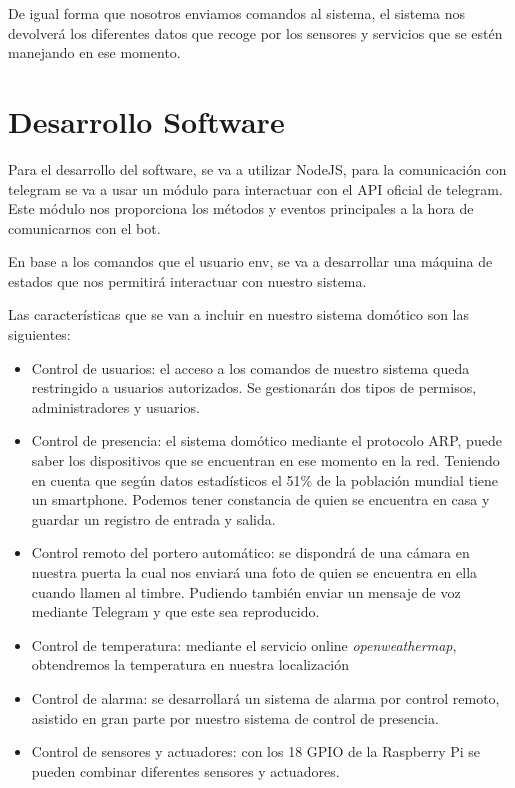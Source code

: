 \documentclass[10pt,journal,compsoc]{IEEEtran}
\begin{document}
De igual forma que nosotros enviamos comandos al sistema, el sistema nos devolverá los diferentes datos que recoge por los sensores y servicios que se estén manejando en ese momento.


\section{Desarrollo Software}
Para el desarrollo del software, se va a utilizar NodeJS, para la comunicación con telegram se va a usar un módulo para interactuar con el API oficial de telegram. Este módulo nos proporciona los métodos y eventos principales a la hora de comunicarnos con el bot.

En base a los comandos que el usuario env, se va a desarrollar una máquina de estados que nos permitirá interactuar con nuestro sistema.

Las características que se van a incluir en nuestro sistema domótico son las siguientes:
\begin{itemize}
\item Control de usuarios: el acceso a los comandos de nuestro sistema queda restringido a usuarios autorizados. Se gestionarán dos tipos de permisos, administradores y usuarios.
\item Control de presencia: el sistema domótico mediante el protocolo ARP, puede saber los dispositivos que se encuentran en ese momento en la red. Teniendo en cuenta que según datos estadísticos el 51\% de la población mundial tiene un smartphone. Podemos tener constancia de quien se encuentra en casa y guardar un registro de entrada y salida.
\item Control remoto del portero automático: se dispondrá de una cámara en nuestra puerta la cual nos enviará una foto de quien se encuentra en ella cuando llamen al timbre. Pudiendo también enviar un mensaje de voz mediante Telegram y que este sea reproducido.
\item Control de temperatura: mediante el servicio online \textit{openweathermap}, obtendremos la temperatura en nuestra localización
\item Control de alarma: se desarrollará un sistema de alarma por control remoto, asistido en gran parte por nuestro sistema de control de presencia.
\item Control de sensores y actuadores: con los 18 GPIO de la Raspberry Pi se pueden combinar diferentes sensores y actuadores.
\end{itemize}
\end{document}
